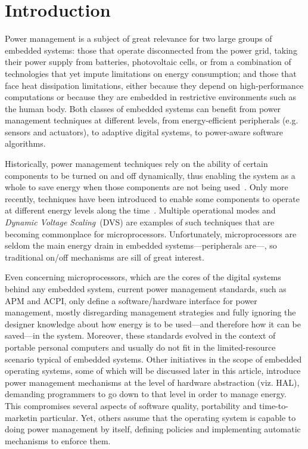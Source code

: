 \section{Introduction}\label{sec:intro}

Power management is a subject of great relevance for two large groups of
embedded systems: those that operate disconnected from the power grid,
taking their power supply from batteries, photovoltaic cells, or from a
combination of technologies that yet impute limitations on energy
consumption; and those that face heat dissipation limitations, either
because they depend on high-performance computations or because they are
embedded in restrictive environments such as the human body. Both
classes of embedded systems can benefit from power management techniques
at different levels, from energy-efficient peripherals (e.g. sensors and
actuators), to adaptive digital systems, to power-aware software
algorithms.

Historically, power management techniques rely on the ability of certain
components to be turned on and off dynamically, thus enabling the system
as a whole to save energy when those components are not being
used~\cite{Monteiro:1996}. Only more recently, techniques have been
introduced to enable some components to operate at different energy
levels along the time~\cite{Benini:1998}. Multiple operational modes and
\emph{Dynamic Voltage Scaling}~(DVS) are examples of such techniques
that are becoming commonplace for microprocessors.  Unfortunately,
microprocessors are seldom the main energy drain in embedded
systems---peripherals are---, so traditional on/off mechanisms are sill
of great interest.

Even concerning microprocessors, which are the cores of the digital
systems behind any embedded system, current power management standards,
such as APM and ACPI, only define a software/hardware interface for
power management, mostly disregarding management strategies and fully
ignoring the designer knowledge about how energy is to be used---and
therefore how it can be saved---in the system. Moreover, these standards
evolved in the context of portable personal computers and usually do not
fit in the limited-resource scenario typical of embedded systems.  Other
initiatives in the scope of embedded operating systems, some of which
will be discussed later in this article, introduce power management
mechanisms at the level of hardware abstraction (viz. HAL), demanding
programmers to go down to that level in order to manage energy. This
compromises several aspects of software quality, portability and
time-to-marketin particular. Yet, others assume that the operating
system is capable to doing power management by itself, defining policies
and implementing automatic mechanisms to enforce them.

